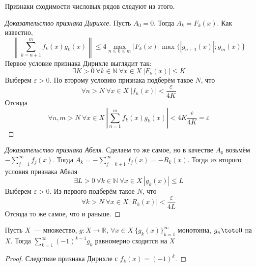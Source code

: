 \documentclass{article}
\let\eps\varepsilon
\begin{document}
    \begin{remark}
        Признаки сходимости числовых рядов следуют из этого.
    \end{remark}
    \begin{proof}[Доказательство признака Дирихле]
        Пусть $A_0=0$. Тогда $A_k=F_k(x)$. Как известно,
        $$
        \left\|\sum\limits_{k=n+1}^mf_k(x)g_k(x)\right\|\leqslant4\max\limits_{n\leqslant k\leqslant m}|F_k(x)|\max\{|g_{n+1}(x)|;g_m(x)\}
        $$
        Первое условие признака Дирихле выглядит так:
        $$
        \exists K>0~\forall k\in\mathbb N~\forall x\in X~|F_k(x)|\leqslant K
        $$
        Выберем $\eps>0$. По второму условию признака подберём такое $N$, что
        $$
        \forall n>N~\forall x\in X~|f_n(x)|<\frac\eps{4K}
        $$
        Отсюда
        $$
        \forall n,m>N~\forall x\in X~\left|\sum\limits_{n=1}^mf_k(x)g_k(x)\right|<4K\frac\eps{4K}=\eps
        $$
    \end{proof}
    \begin{proof}[Доказательство признака Абеля]
        Сделаем то же самое, но в качестве $A_0$ возьмём $-\sum\limits_{j=1}^\infty f_j(x)$. Тогда $A_k=-\sum\limits_{j=k+1}^\infty f_j(x)=-R_k(x)$. Тогда из второго условия признака Абеля
        $$
        \exists L>0~\forall k\in\mathbb N~\forall x\in X~|g_k(x)|\leqslant L
        $$
        Выберем $\eps>0$. Из первого подберём такое $N$, что
        $$
        \forall k>N~\forall x\in X~|R_k(x)|<\frac\eps{4L}
        $$
        Отсюда то же самое, что и раньше.
    \end{proof}
    \begin{corollary}
        Пусть $X$~--- множество, $g\colon X\to\mathbb R$, $\forall x\in X~\{g_k(x)\}_{k=1}^\infty$ монотонна, $g_n\toto0$ на $X$. Тогда $\sum\limits_{k=1}^\infty(-1)^{k-1}g_k$ равномерно сходится на $X$
    \end{corollary}
    \begin{proof}
        Следствие признака Дирихле с $f_k(x)=(-1)^k$.
    \end{proof}
\end{document}
